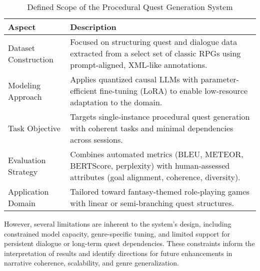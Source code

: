 \noindent
\begin{table}[H]
  \centering
  \scriptsize
  \renewcommand{\arraystretch}{1.3}
  \begin{tabularx}{0.95\textwidth}{
    >{\raggedright\arraybackslash}p{5cm}
    >{\raggedright\arraybackslash}X
  }
    \toprule
    \textbf{Aspect} & \textbf{Description} \\
    \midrule
    Dataset Construction
      & Focused on structuring quest and dialogue data extracted from a select set of classic RPGs using prompt-aligned, XML-like annotations. \\
    Modeling Approach
      & Applies quantized causal LLMs with parameter-efficient fine-tuning (LoRA) to enable low-resource adaptation to the domain. \\
    Task Objective
      & Targets single-instance procedural quest generation with coherent tasks and minimal dependencies across sessions. \\
    Evaluation Strategy
      & Combines automated metrics (BLEU, METEOR, BERTScore, perplexity) with human-assessed attributes (goal alignment, coherence, diversity). \\
    Application Domain
      & Tailored toward fantasy-themed role-playing games with linear or semi-branching quest structures. \\
    \bottomrule
  \end{tabularx}
  \caption{Defined Scope of the Procedural Quest Generation System}
\end{table}

However, several limitations are inherent to the system's design, including constrained
model capacity, genre-specific tuning, and limited support for persistent dialogue or long-term
quest dependencies. These constraints inform the interpretation of results and identify
directions for future enhancements in narrative coherence, scalability, and genre generalization.

